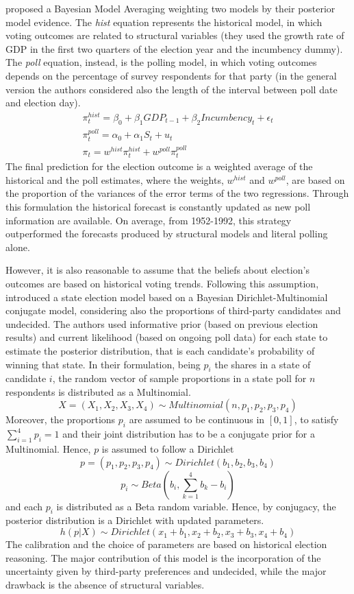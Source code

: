 \documentclass[
  12pt]{article}
\begin{document}
\citet{bro:cha:1999} proposed a Bayesian Model Averaging weighting two
models by their posterior model evidence. The \emph{hist} equation
represents the historical model, in which voting outcomes are related to
structural variables (they used the growth rate of GDP in the first two
quarters of the election year and the incumbency dummy). The \emph{poll}
equation, instead, is the polling model, in which voting outcomes
depends on the percentage of survey respondents for that party (in the
general version the authors considered also the length of the interval
between poll date and election day). \[
\begin{aligned}
\pi_{t}^{hist} = \beta_0 + \beta_1 GDP_{t-1} + \beta_2 Incumbency_t + \epsilon_t \\
\pi_{t}^{poll} = \alpha_0 + \alpha_1 S_t + u_t \;\;\;\;\;\;\;\;\;\;\;\;\;\;\;\; \\
\pi_{t} =  w^{hist} \pi_{t}^{hist} + w^{poll} \pi_{t}^{poll} \;\;\;\;\;\;\;\;\;\;\;\;\; 
\end{aligned}
\] The final prediction for the election outcome is a weighted average
of the historical and the poll estimates, where the weights,
\(w^{hist}\) and \(w^{poll}\), are based on the proportion of the
variances of the error terms of the two regressions. Through this
formulation the historical forecast is constantly updated as new poll
information are available. On average, from 1952-1992, this strategy
outperformed the forecasts produced by structural models and literal
polling alone.

However, it is also reasonable to assume that the beliefs about
election's outcomes are based on historical voting trends. Following
this assumption, \citet{rig:2009} introduced a state election model
based on a Bayesian Dirichlet-Multinomial conjugate model, considering
also the proportions of third-party candidates and undecided. The
authors used informative prior (based on previous election results) and
current likelihood (based on ongoing poll data) for each state to
estimate the posterior distribution, that is each candidate's
probability of winning that state. In their formulation, being \(p_i\)
the shares in a state of candidate \(i\), the random vector of sample
proportions in a state poll for \(n\) respondents is distributed as a
Multinomial.
\[X = (X_1, X_2, X_3, X_4) \sim Multinomial(n, p_1, p_2, p_3, p_4)\]
Moreover, the proportions \(p_i\) are assumed to be continuous in
\([0,1]\), to satisfy \(\sum_{i = 1}^{4} p_i = 1\) and their joint
distribution has to be a conjugate prior for a Multinomial. Hence, \(p\)
is assumed to follow a Dirichlet
\[p = (p_1, p_2, p_3, p_4) \sim Dirichlet(b_1, b_2, b_3, b_4)\]
\[p_i \sim Beta(b_i, \sum_{k = 1}^{4} b_k - b_i)\] and each \(p_i\) is
distributed as a Beta random variable. Hence, by conjugacy, the
posterior distribution is a Dirichlet with updated parameters.
\[h(p|X) \sim Dirichlet(x_1 + b_1, x_2 + b_2, x_3 + b_3, x_4 + b_4)\]
The calibration and the choice of parameters are based on historical
election reasoning. The major contribution of this model is the
incorporation of the uncertainty given by third-party preferences and
undecided, while the major drawback is the absence of structural
variables.
\end{document}
